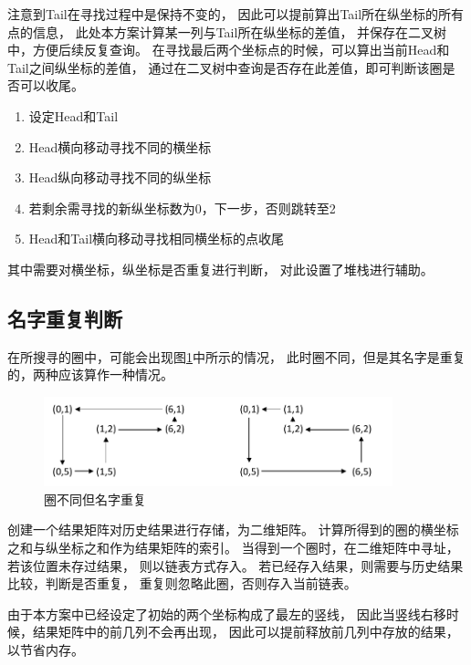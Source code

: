 \documentclass[UTF8]{article}   %
\begin{document}
注意到Tail在寻找过程中是保持不变的，
因此可以提前算出Tail所在纵坐标的所有点的信息，
此处本方案计算某一列与Tail所在纵坐标的差值，
并保存在二叉树中，方便后续反复查询。
在寻找最后两个坐标点的时候，可以算出当前Head和Tail之间纵坐标的差值，
通过在二叉树中查询是否存在此差值，即可判断该圈是否可以收尾。


\begin{enumerate}
  \item 设定Head和Tail
  \item Head横向移动寻找不同的横坐标
  \item Head纵向移动寻找不同的纵坐标
  \item 若剩余需寻找的新纵坐标数为0，下一步，否则跳转至2
  \item Head和Tail横向移动寻找相同横坐标的点收尾
\end{enumerate}

其中需要对横坐标，纵坐标是否重复进行判断，
对此设置了堆栈进行辅助。

\subsection{名字重复判断}
在所搜寻的圈中，可能会出现图{\ref{RepeatName}}中所示的情况，
此时圈不同，但是其名字是重复的，两种应该算作一种情况。

\begin{figure}[H]
  \centering
  \includegraphics[width=0.9\textwidth]{./pic/RepeatName}
  \caption{圈不同但名字重复}
  \label{RepeatName}
\end{figure}

创建一个结果矩阵对历史结果进行存储，为二维矩阵。
计算所得到的圈的横坐标之和与纵坐标之和作为结果矩阵的索引。
当得到一个圈时，在二维矩阵中寻址，若该位置未存过结果，
则以链表方式存入。
若已经存入结果，则需要与历史结果比较，判断是否重复，
重复则忽略此圈，否则存入当前链表。

由于本方案中已经设定了初始的两个坐标构成了最左的竖线，
因此当竖线右移时候，结果矩阵中的前几列不会再出现，
因此可以提前释放前几列中存放的结果，以节省内存。
\end{document}
